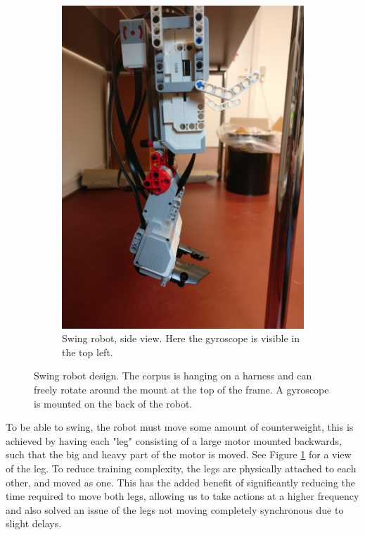\documentclass[11pt, a4paper]{article}
\begin{document}
\begin{figure}[H]
\begin{subfigure}{.48\textwidth}
			\includegraphics[width=1\linewidth]{images/swing_robot_side_right}
			\caption{Swing robot, side view. Here the gyroscope is visible in the top left.}
			\label{fig:swing_robot_side}
		\end{subfigure}%
		\caption{Swing robot design. The corpus is hanging on a harness and can freely rotate around the mount at the top of the frame. A gyroscope is mounted on the back of the robot.}
		\label{fig:swing_robot}
	\end{figure}
	
	To be able to swing, the robot must move some amount of counterweight, this is achieved by having each "leg" consisting of a large motor mounted backwards, such that the big and heavy part of the motor is moved. See Figure \ref{fig:swing_robot_side} for a view of the leg. To reduce training complexity, the legs are physically attached to each other, and moved as one. This has the added benefit of significantly reducing the time required to move both legs, allowing us to take actions at a higher frequency and also solved an issue of the legs not moving completely synchronous due to slight delays.
	
\end{document}
